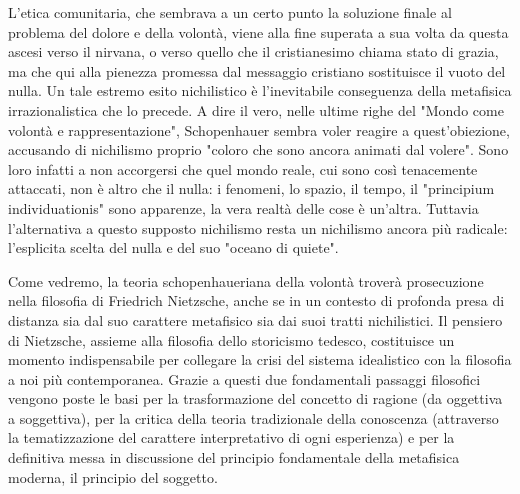  L’etica comunitaria, che sembrava a un certo punto la soluzione finale al problema del dolore e della volontà, viene alla fine superata a sua volta da questa ascesi verso il nirvana, o verso quello che il cristianesimo chiama stato di grazia, ma che qui alla pienezza promessa dal messaggio cristiano sostituisce il vuoto del nulla. Un tale estremo esito nichilistico è l’inevitabile conseguenza della metafisica irrazionalistica che lo precede. A dire il vero, nelle ultime righe del "Mondo come volontà e rappresentazione", Schopenhauer sembra voler reagire a quest’obiezione, accusando di nichilismo proprio "coloro che sono ancora animati dal volere". Sono loro infatti a non accorgersi che quel mondo reale, cui sono così tenacemente attaccati, non è altro che il nulla: i fenomeni, lo spazio, il tempo, il "principium individuationis" sono apparenze, la vera realtà delle cose è un’altra. Tuttavia l’alternativa a questo supposto nichilismo resta un nichilismo ancora più radicale: l’esplicita scelta del nulla e del suo "oceano di quiete". 
 
 Come vedremo, la teoria schopenhaueriana della volontà troverà prosecuzione nella filosofia di Friedrich Nietzsche, anche se in un contesto di profonda presa di distanza sia dal suo carattere metafisico sia dai suoi tratti nichilistici. Il pensiero di Nietzsche, assieme alla filosofia dello storicismo tedesco, costituisce un momento indispensabile per collegare la crisi del sistema idealistico con la filosofia a noi più contemporanea. Grazie a questi due fondamentali passaggi filosofici vengono poste le basi per la trasformazione del concetto di ragione (da oggettiva a soggettiva), per la critica della teoria tradizionale della conoscenza (attraverso la tematizzazione del carattere interpretativo di ogni esperienza) e per la definitiva messa in discussione del principio fondamentale della metafisica moderna, il principio del soggetto.